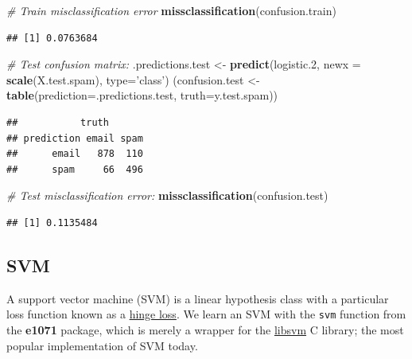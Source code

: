 \documentclass[]{book}
\newenvironment{Shaded}{\begin{snugshade}}{\end{snugshade}}
\newcommand{\KeywordTok}[1]{\textcolor[rgb]{0.13,0.29,0.53}{\textbf{#1}}}
\newcommand{\DataTypeTok}[1]{\textcolor[rgb]{0.13,0.29,0.53}{#1}}
\newcommand{\DecValTok}[1]{\textcolor[rgb]{0.00,0.00,0.81}{#1}}
\newcommand{\StringTok}[1]{\textcolor[rgb]{0.31,0.60,0.02}{#1}}
\newcommand{\CommentTok}[1]{\textcolor[rgb]{0.56,0.35,0.01}{\textit{#1}}}
\newcommand{\NormalTok}[1]{#1}
\theoremstyle{definition}
\theoremstyle{definition}
\theoremstyle{definition}
\theoremstyle{remark}
\begin{document}
\begin{Shaded}
\begin{Highlighting}[]
\CommentTok{# Train misclassification error}
\KeywordTok{missclassification}\NormalTok{(confusion.train)}
\end{Highlighting}
\end{Shaded}

\begin{verbatim}
## [1] 0.0763684
\end{verbatim}

\begin{Shaded}
\begin{Highlighting}[]
\CommentTok{# Test confusion matrix:}
\NormalTok{.predictions.test <-}\StringTok{ }\KeywordTok{predict}\NormalTok{(logistic.}\DecValTok{2}\NormalTok{, }\DataTypeTok{newx =} \KeywordTok{scale}\NormalTok{(X.test.spam), }\DataTypeTok{type=}\StringTok{'class'}\NormalTok{) }
\NormalTok{(confusion.test <-}\StringTok{ }\KeywordTok{table}\NormalTok{(}\DataTypeTok{prediction=}\NormalTok{.predictions.test, }\DataTypeTok{truth=}\NormalTok{y.test.spam))}
\end{Highlighting}
\end{Shaded}

\begin{verbatim}
##           truth
## prediction email spam
##      email   878  110
##      spam     66  496
\end{verbatim}

\begin{Shaded}
\begin{Highlighting}[]
\CommentTok{# Test misclassification error:}
\KeywordTok{missclassification}\NormalTok{(confusion.test)}
\end{Highlighting}
\end{Shaded}

\begin{verbatim}
## [1] 0.1135484
\end{verbatim}

\subsection{SVM}\label{svm}

A support vector machine (SVM) is a linear hypothesis class with a
particular loss function known as a
\href{https://en.wikipedia.org/wiki/Hinge_loss}{hinge loss}. We learn an
SVM with the \texttt{svm} function from the \textbf{e1071} package,
which is merely a wrapper for the
\href{https://www.csie.ntu.edu.tw/~cjlin/libsvm/}{libsvm} C library; the
most popular implementation of SVM today.
\end{document}
